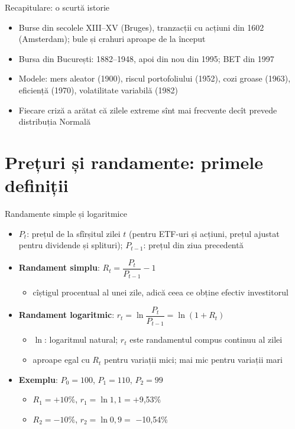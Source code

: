 \begin{frame}{Recapitulare: o scurtă istorie}
\itemsize{\small}
\begin{itemize}
    \item Burse din secolele XIII--XV (Bruges), tranzacții cu acțiuni din 1602 (Amsterdam); bule și crahuri aproape de la început
    \item Bursa din București: 1882--1948, apoi din nou din 1995; BET din 1997
    \item Modele: mers aleator (1900), riscul portofoliului (1952), cozi groase (1963), eficiență (1970), volatilitate variabilă (1982)
    \item Fiecare criză a arătat că zilele extreme sînt mai frecvente decît prevede distribuția Normală
\end{itemize}
\end{frame}


\section{Prețuri și randamente: primele definiții}

\begin{frame}{Randamente simple și logaritmice}
\itemsize{\small}
\begin{itemize}
    \item $P_t$: prețul de la sfîrșitul zilei $t$ (pentru ETF-uri și acțiuni, prețul ajustat pentru dividende și splituri); $P_{t-1}$: prețul din ziua precedentă
    \item \textbf{Randament simplu}: $R_t = \dfrac{P_t}{P_{t-1}} - 1$
    \begin{itemize}
        \item cîștigul procentual al unei zile, adică ceea ce obține efectiv investitorul
    \end{itemize}
    \item \textbf{Randament logaritmic}: $r_t = \ln \dfrac{P_t}{P_{t-1}} = \ln(1 + R_t)$
    \begin{itemize}
        \item $\ln$: logaritmul natural; $r_t$ este randamentul compus continuu al zilei
        \item aproape egal cu $R_t$ pentru variații mici; mai mic pentru variații mari
    \end{itemize}
    \item \textbf{Exemplu}: $P_0 = 100$, $P_1 = 110$, $P_2 = 99$
    \begin{itemize}
        \item $R_1 = +10\%$, $r_1 = \ln 1{,}1 = +$9{,}53\%
        \item $R_2 = -10\%$, $r_2 = \ln 0{,}9 = $ \ensuremath{-}10{,}54\%
    \end{itemize}
\end{itemize}
\end{frame}

